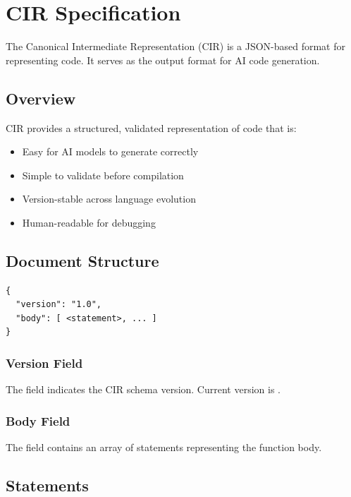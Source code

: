 \chapter{CIR Specification}
\label{ch:cir}

The Canonical Intermediate Representation (CIR) is a JSON-based format for representing \haira{} code. It serves as the output format for AI code generation.

\section{Overview}

CIR provides a structured, validated representation of code that is:
\begin{itemize}
    \item Easy for AI models to generate correctly
    \item Simple to validate before compilation
    \item Version-stable across language evolution
    \item Human-readable for debugging
\end{itemize}

\section{Document Structure}

\begin{lstlisting}[language={}]
{
  "version": "1.0",
  "body": [ <statement>, ... ]
}
\end{lstlisting}

\subsection{Version Field}

The  field indicates the CIR schema version. Current version is .

\subsection{Body Field}

The  field contains an array of statements representing the function body.

\section{Statements}


